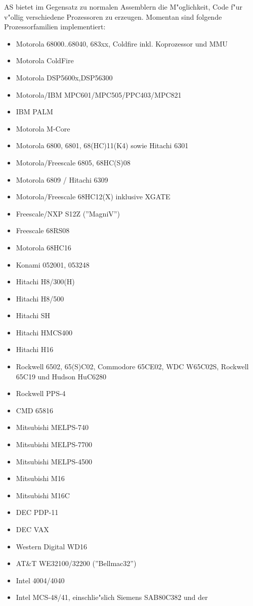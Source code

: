 \documentclass[12pt,a4paper,twoside]{report}
\newcommand{\asname}{AS}
\begin{document}
\asname{} bietet im Gegensatz zu normalen Assemblern die M"oglichkeit, Code
f"ur v"ollig verschiedene Prozessoren zu erzeugen.  Momentan sind
folgende Prozessorfamilien implementiert:
\begin{itemize}
\item{Motorola 68000..68040, 683xx, Coldfire inkl. Koprozessor und MMU}
\item{Motorola ColdFire}
\item{Motorola DSP5600x,DSP56300}
\item{Motorola/IBM MPC601/MPC505/PPC403/MPC821}
\item{IBM PALM}
\item{Motorola M-Core}
\item{Motorola 6800, 6801, 68(HC)11(K4) sowie Hitachi 6301}
\item{Motorola/Freescale 6805, 68HC(S)08}
\item{Motorola 6809 / Hitachi 6309}
\item{Motorola/Freescale 68HC12(X) inklusive XGATE}
\item{Freescale/NXP S12Z (''MagniV'')}
\item{Freescale 68RS08}
\item{Motorola 68HC16}
\item{Konami 052001, 053248}
\item{Hitachi H8/300(H)}
\item{Hitachi H8/500}
\item{Hitachi SH}
\item{Hitachi HMCS400}
\item{Hitachi H16}
\item{Rockwell 6502, 65(S)C02, Commodore 65CE02, WDC W65C02S, Rockwell 65C19 und
      Hudson HuC6280}
\item{Rockwell PPS-4}
\item{CMD 65816}
\item{Mitsubishi MELPS-740}
\item{Mitsubishi MELPS-7700}
\item{Mitsubishi MELPS-4500}
\item{Mitsubishi M16}
\item{Mitsubishi M16C}
\item{DEC PDP-11}
\item{DEC VAX}
\item{Western Digital WD16}
\item{AT\&T WE32100/32200 (''Bellmac32'')}
\item{Intel 4004/4040}
\item{Intel MCS-48/41, einschlie"slich Siemens SAB80C382 und der
}
\end{itemize}
\end{document}
